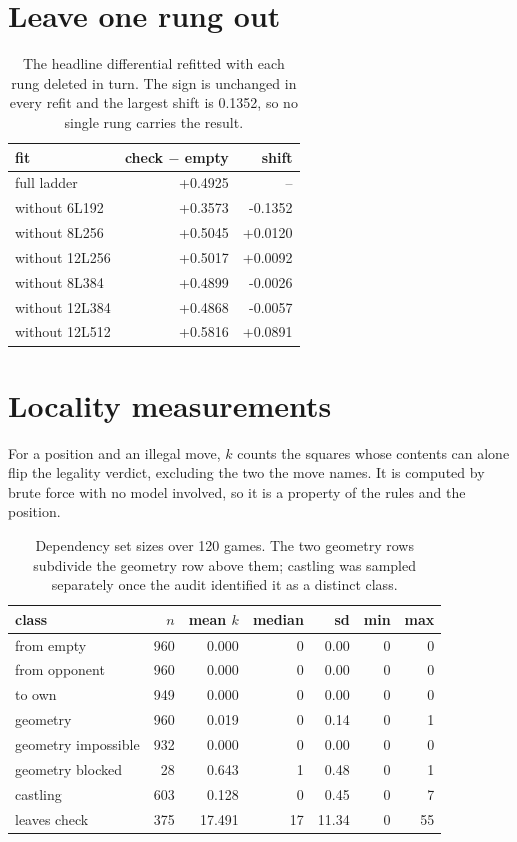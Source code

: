 \documentclass[11pt]{article}
\begin{document}
\section{Leave one rung out}

\begin{table}[htbp]
\centering\small
\caption{The headline differential refitted with each rung deleted in turn. The sign is unchanged in every refit and the largest shift is 0.1352, so no single rung carries the result.}
\label{tab:s-loro}
\begin{tabular}{lrr}
\toprule
fit & check $-$ empty & shift \\
\midrule
full ladder & +0.4925 & -- \\
without 6L192 & +0.3573 & -0.1352 \\
without 8L256 & +0.5045 & +0.0120 \\
without 12L256 & +0.5017 & +0.0092 \\
without 8L384 & +0.4899 & -0.0026 \\
without 12L384 & +0.4868 & -0.0057 \\
without 12L512 & +0.5816 & +0.0891 \\
\bottomrule
\end{tabular}
\end{table}

\section{Locality measurements}

For a position and an illegal move, $k$ counts the squares whose contents can alone flip the legality verdict, excluding the two the move names. It is computed by brute force with no model involved, so it is a property of the rules and the position.

\begin{table}[htbp]
\centering\small
\caption{Dependency set sizes over 120 games. The two geometry rows subdivide the geometry row above them; castling was sampled separately once the audit identified it as a distinct class.}
\label{tab:s-locality}
\begin{tabular}{lrrrrrr}
\toprule
class & $n$ & mean $k$ & median & sd & min & max \\
\midrule
from empty & 960 & 0.000 & 0 & 0.00 & 0 & 0 \\
from opponent & 960 & 0.000 & 0 & 0.00 & 0 & 0 \\
to own & 949 & 0.000 & 0 & 0.00 & 0 & 0 \\
geometry & 960 & 0.019 & 0 & 0.14 & 0 & 1 \\
geometry impossible & 932 & 0.000 & 0 & 0.00 & 0 & 0 \\
geometry blocked & 28 & 0.643 & 1 & 0.48 & 0 & 1 \\
castling & 603 & 0.128 & 0 & 0.45 & 0 & 7 \\
leaves check & 375 & 17.491 & 17 & 11.34 & 0 & 55 \\
\bottomrule
\end{tabular}
\end{table}
\end{document}
